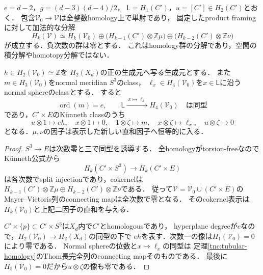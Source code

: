 \begin{proposition}
\label{tnc:complement-product-splitting}
$e=d-2$，$g=(d-3)(d-4)/2$，
$\mathsf L=H_1(C')$，$u=[C']\in H_2(C')$とおく．
包含$\mathcal V_0\to\mathcal V$は全整数homology上で単射であり，
固定したproduct framingに対して加法的な分解
\[
 H_k(\mathcal V)\simeq H_k(\mathcal V_0)
 \oplus \bigl(H_{k-1}(C')\otimes\mathbb Z\mu\bigr)
 \oplus \bigl(H_{k-2}(C')\otimes\mathbb Z\nu\bigr)
\]
が成立する．負次数の群は零とする．
これはhomology群の分解であり，空間の積分解やhomotopy分解ではない．

$h\in H_2(\mathcal V_0)\simeq\mathbb Z$を
$H_2(X_d)$の正の生成元へ写る生成元とする．
また$m\in H_3(\mathcal V_0)$をnormal meridian $S^3$のclass，
$\ell_x\in H_4(\mathcal V_0)$を$x\in\mathsf L$に沿うnormal sphereのclassとする．
すると
\[
 \operatorname{ord}(m)=e,
 \qquad \mathsf L\xrightarrow{\;x\mapsto\ell_x\;}H_4(\mathcal V_0)
 \quad\text{は同型}
\]
であり，$C'\times E$のK\"unneth classのうち
\[
 u\otimes1\longmapsto eh,\quad
 x\otimes1\longmapsto0,\quad
 1\otimes\zeta\longmapsto m,\quad
 x\otimes\zeta\longmapsto\ell_x,\quad
 u\otimes\zeta\longmapsto0
\]
となる．$\mu,\nu$の因子は表示した新しい直和因子へ恒等的に入る．
\end{proposition}

\begin{proof}
$S^3\to E$は次数零と三で同型を誘導する．
全homologyがtorsion-freeなのでK\"unneth公式から
\[
 H_k(C'\times S^3)\longrightarrow H_k(C'\times E)
\]
は各次数でsplit injectionであり，cokernelは
$H_{k-1}(C')\otimes\mathbb Z\mu\oplus
H_{k-2}(C')\otimes\mathbb Z\nu$である．
従って$\mathcal V=\mathcal V_0\cup(C'\times E)$の
Mayer--Vietoris列のconnecting mapは全次数で零となる．
そのcokernel表示は$H_k(\mathcal V_0)$と上記二因子の直和を与える．

$C'\times\{p\}\subset C'\times S^3$は$X_d$内で$C'$とhomologousであり，
hyperplane degreeが$e$なので，$H_2(\mathcal V_0)\to H_2(X_d)$の同型の下で
$eh$を表す．次数一の像は$H_1(\mathcal V_0)=0$により零である．
Normal sphereの位数と$x\mapsto\ell_x$の同型は
定理\ref{tnc:tubular-homology}のThom長完全列のconnecting mapそのものである．
最後に$H_5(\mathcal V_0)=0$だから$u\otimes\zeta$の像も零である．
\end{proof}

